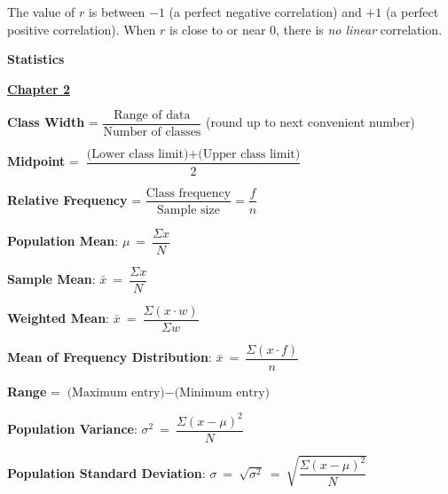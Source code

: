 \documentclass{article}
\begin{document}
\begin{large}
\hspace{0.1in} The value of $r$ is between $-1$ (a perfect negative correlation) and $+1$ (a perfect positive correlation).  When $r$ is close to or near $0$, there is \textit{no linear} correlation.

\newpage

\chead{ }

\vspace*{\fill}

\begin{center}\textbf{\Huge{ Statistics }}\end{center}

\vspace*{\fill}

\newpage


\newpage



\vspace{0.25in}

\underline{\textbf{\huge Chapter 2 \phantom{ } \phantom{ } \phantom{ } \phantom{ }}}

\textbf{Class Width} = $\dfrac{\text{Range of data}}{\text{Number of classes}}$ (round up to next convenient number)

\textbf{Midpoint} = $\dfrac{\text{(Lower class limit)} + \text{(Upper class limit)}}{2}$

\textbf{Relative Frequency} = $\dfrac{\text{Class frequency}}{\text{Sample size}} = \dfrac{f}{n}$

\textbf{Population Mean}: $\mu\ =\ \dfrac{\Sigma x}{N}$

\textbf{Sample Mean}: $\bar{x}\ =\ \dfrac{\Sigma x}{N}$

\textbf{Weighted Mean}:  $\bar{x}\ =\ \dfrac{\Sigma (x\cdot w)}{\Sigma w}$

\textbf{Mean of Frequency Distribution}: $\bar{x}\ =\ \dfrac{\Sigma (x\cdot f)}{n}$

\textbf{Range} = $\text{(Maximum entry)} - \text{(Minimum entry)}$

\textbf{Population Variance}:  $\sigma^{2}\ =\ \dfrac{\Sigma (x - \mu)^{2}}{N}$

\textbf{Population Standard Deviation}: $\sigma\ =\ \sqrt{\sigma^{2}}\ =\ \sqrt{\dfrac{\Sigma (x - \mu)^{2}}{N}}$


\end{large}
\end{document}
